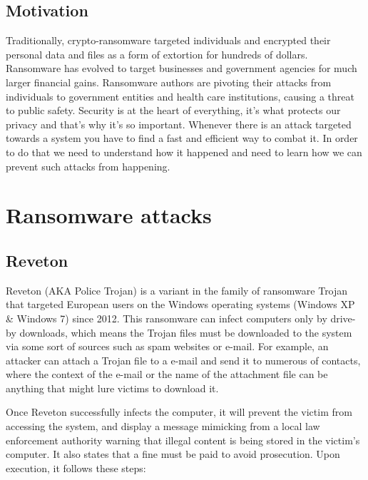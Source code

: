 \documentclass[10pt,a4paper]{article}
\begin{document}
\subsection{Motivation}
Traditionally, crypto-ransomware targeted individuals and encrypted their personal data and files as a form of extortion for hundreds of dollars. Ransomware has evolved to target businesses and government agencies for much larger financial gains. Ransomware authors are pivoting their attacks from individuals to government entities and health care institutions, causing a threat to public safety. Security is at the heart of everything, it's what protects our privacy and that's why it's so important. Whenever there is an attack targeted towards a system you have to find a fast and efficient way to combat it. In order to do that we need to understand how it happened and need to learn how we can prevent such attacks from happening.

\section{Ransomware attacks}

\subsection{Reveton}
Reveton (AKA Police Trojan) is a variant in the family of ransomware Trojan that targeted European users on the Windows operating systems (Windows XP \& Windows 7) since 2012. This ransomware can infect computers only by drive-by downloads, which means the Trojan files must be downloaded to the system via some sort of sources such as spam websites or e-mail. For example, an attacker can attach a Trojan file to a e-mail and send it to numerous of contacts, where the context of the e-mail or the name of the attachment file can be anything that might lure victims to download it.

Once Reveton successfully infects the computer, it will prevent the victim from accessing the system, and display a message mimicking from a local law enforcement authority warning that illegal content is being stored in the victim’s computer. It also states that a fine must be paid to avoid prosecution.
Upon execution, it follows these steps\cite{revetonanalysis}:
\end{document}
